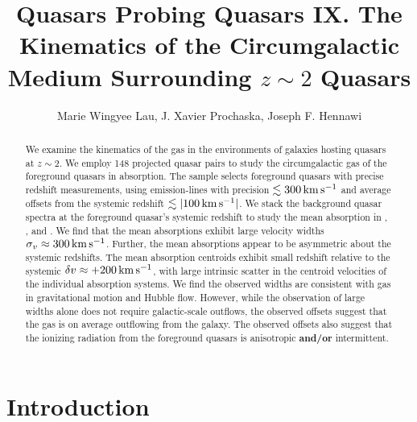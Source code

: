\documentclass[iop]{emulateapj}
\begin{document}
\title{Quasars Probing Quasars IX. The Kinematics of the Circumgalactic Medium Surrounding
$z\sim2$ Quasars}

\author{Marie Wingyee Lau, J. Xavier Prochaska,
Joseph F. Hennawi
}

\begin{abstract}
We examine the kinematics of the gas in the environments of galaxies hosting quasars at $z\sim2$.
We employ 148 projected quasar pairs to study the circumgalactic gas of the foreground quasars in
absorption. The sample selects foreground quasars with precise redshift measurements, using
emission-lines with precision $\lesssim300\,{\rm km\,s^{-1}}$ and average offsets from the
systemic redshift $\lesssim|100\,{\rm km\,s^{-1}}|$. We stack the background quasar spectra at the
foreground quasar's systemic redshift to study the mean absorption in , ,
and .
We find that the mean absorptions exhibit large velocity widths
$\sigma_v\approx300\,{\rm km\,s^{-1}}$. Further, the mean absorptions appear to be asymmetric about
the systemic redshifts. The mean absorption centroids exhibit small redshift relative to the
systemic $\delta v\approx+200\,{\rm km\,s^{-1}}$, with large intrinsic scatter in the centroid
velocities of the individual absorption systems.
We find the observed widths are consistent with gas in gravitational
motion and Hubble flow. However, while the observation of large widths alone does not require
galactic-scale outflows, the observed offsets suggest that the gas is on average outflowing from the
galaxy. The observed offsets also suggest that the ionizing radiation from the foreground quasars
is anisotropic {\bf and/or} intermittent.
\end{abstract}



\section{Introduction}
\label{sec:introduction}
\end{document}
